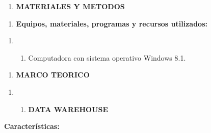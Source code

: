\documentclass{article} %
\begin{document}
\noindent 

\noindent 

\noindent 

\noindent 

\noindent 

\noindent 

\noindent 

\noindent \textbf{}

\noindent \textbf{}

\begin{enumerate}
\item \textbf{ MATERIALES Y METODOS}
\end{enumerate}

\noindent \textbf{}

\begin{enumerate}
\item \textbf{ Equipos, materiales, programas y recursos utilizados:}
\end{enumerate}

\noindent \textbf{}

\begin{enumerate}
\item \begin{enumerate}
\item \textbf{ }Computadora con sistema operativo Windows 8.1.
\end{enumerate}
\end{enumerate}

\noindent \textbf{}

\begin{enumerate}
\item \textbf{ MARCO TEORICO}
\end{enumerate}

\noindent \textbf{}

\begin{enumerate}
\item \begin{enumerate}
\item \textbf{ DATA WAREHOUSE}
\end{enumerate}
\end{enumerate}

\noindent \textbf{}

\noindent \textbf{Caracter\'{i}sticas:}
\end{document}
